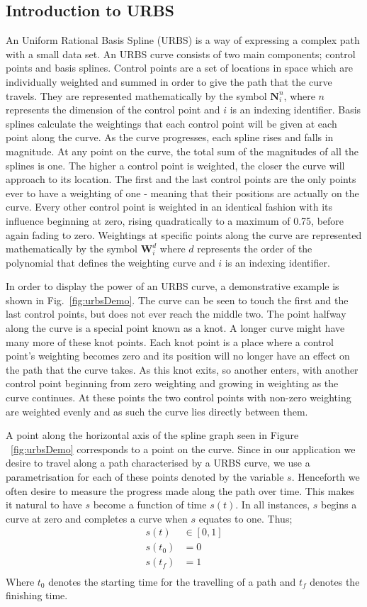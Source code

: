 \subsection{Introduction to URBS}
An Uniform Rational Basis Spline (URBS) is a way of expressing a complex path with a small data set. An URBS curve consists of two main components; control points and basis splines.
Control points are a set of locations in space which are individually weighted and summed in order to give the path that the curve travels. They are represented mathematically by the symbol $\textbf{N}^n_i$, where $n$ represents the dimension of the control point and $i$ is an indexing identifier.
Basis splines calculate the weightings that each control point will be given at each point along the curve. As the curve progresses, each spline rises and falls in magnitude. At any point on the curve, the total sum of the magnitudes of all the splines is one.
The higher a control point is weighted, the closer the curve will approach to its location. The first and the last control points are the only points ever to have a weighting of one - meaning that their positions are actually on the curve. Every other control point is weighted in an identical fashion with its influence beginning at zero, rising quadratically to a maximum of 0.75, before again fading to zero. Weightings at specific points along the curve are represented mathematically by the symbol $\textbf{W}_i^d$ where $d$ represents the order of the polynomial that defines the weighting curve and $i$ is an indexing identifier.

In order to display the power of an URBS curve, a demonstrative example is shown in Fig.~\ref{fig:urbsDemo}. The curve can be seen to touch the first and the last control points, but does not ever reach the middle two. The point halfway along the curve is a special point known as a 
knot. A longer curve might have many more of these knot points. Each knot point is a place where a control point's weighting becomes zero and its position will no longer have an effect on the path that the curve takes. As this knot exits, so another enters, with another control point beginning from zero weighting and growing in weighting as the curve continues. At these points the two control points with non-zero weighting are weighted evenly and as such the curve lies directly between them.

A point along the horizontal axis of the spline graph seen in Figure ~\ref{fig:urbsDemo} corresponds to a point on the curve. Since in our application we desire to travel along a path characterised by a URBS curve, we use a parametrisation for each of these points denoted by the variable $s$. Henceforth we often desire to measure the progress made along the path over time. This makes it natural to have $s$ become a function of time $s(t)$. In all instances, $s$ begins a curve at zero and completes a curve when $s$ equates to one. Thus;
\begin{align*}
s(t) &\in [0,1]\\
s(t_0) &= 0\\
s(t_f) &= 1\\
\end{align*}
Where $t_0$ denotes the starting time for the travelling of a path and $t_f$ denotes the finishing time.


